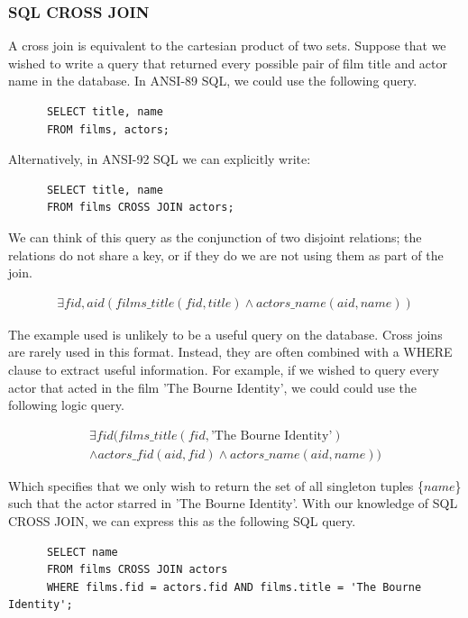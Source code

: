\documentclass[a4paper, 11pt]{article}
\begin{document}
    \subsubsection{SQL CROSS JOIN}

      A cross join is equivalent to the cartesian product of two sets. Suppose
      that we wished to write a query that returned every possible pair of
      film title and actor name in the database. In ANSI-89 SQL, we could use 
      the following query.

      \begin{verbatim}
      SELECT title, name
      FROM films, actors;
      \end{verbatim}

      Alternatively, in ANSI-92 SQL we can explicitly write:

      \begin{verbatim}
      SELECT title, name
      FROM films CROSS JOIN actors;
      \end{verbatim}

      We can think of this query as the conjunction of two disjoint relations;
      the relations do not share a key, or if they do we are not using them as
      part of the join.

      \begin{gather}
        \exists fid, aid(films\_title(fid, title) \land actors\_name(aid, name))
      \end{gather}

      The example used is unlikely to be a useful query on the database. Cross
      joins are rarely used in this format. Instead, they are often combined
      with a WHERE clause to extract useful information. For example, if we
      wished to query every actor that acted in the film 'The Bourne Identity',
      we could could use the following logic query.

      \begin{gather}
        \exists fid(films\_title(fid, \text{'The Bourne Identity'}) \\
        \land actors\_fid(aid, fid) \land actors\_name(aid, name))
      \end{gather}

      Which specifies that we only wish to return the set of all singleton
      tuples \{$name$\} such that the actor starred in 'The Bourne Identity'.
      With our knowledge of SQL CROSS JOIN, we can express this as the
      following SQL query.

      \begin{verbatim}
      SELECT name
      FROM films CROSS JOIN actors
      WHERE films.fid = actors.fid AND films.title = 'The Bourne Identity';
      \end{verbatim}
\end{document}
